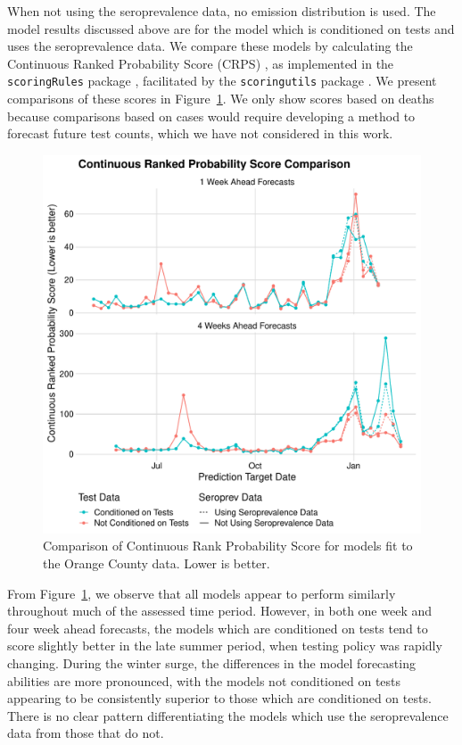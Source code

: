 When not using the seroprevalence data, no emission distribution is used.
The model results discussed above are for the model which is conditioned on tests and uses the seroprevalence data.
We compare these models by calculating the Continuous Ranked Probability Score (CRPS) \citep{CRPS}, as implemented in the \texttt{scoringRules} package \citep{scoringRules}, facilitated by the \texttt{scoringutils} package \citep{scoringutils}.
We present comparisons of these scores in Figure~\ref{ch_4:fig:forecast_crps_plot}.
We only show scores based on deaths because comparisons based on cases would require developing a method to forecast future test counts, which we have not considered in this work.

\begin{figure}[htbp]
    \centering
    \includegraphics[width=0.75\columnwidth]{forecast_crps_plot}
    \caption[Comparison of Continuous Rank Probability Score for models fit to the Orange County data.]{Comparison of Continuous Rank Probability Score for models fit to the Orange County data.
    Lower is better.}
    \label{ch_4:fig:forecast_crps_plot}
\end{figure}

From Figure~\ref{ch_4:fig:forecast_crps_plot}, we observe that all models appear to perform similarly throughout much of the assessed time period.
However, in both one week and four week ahead forecasts, the models which are conditioned on tests tend to score slightly better in the late summer period, when testing policy was rapidly changing.
During the winter surge, the differences in the model forecasting abilities are more pronounced, with the models not conditioned on tests appearing to be consistently superior to those which are conditioned on tests.
There is no clear pattern differentiating the models which use the seroprevalence data from those that do not.

